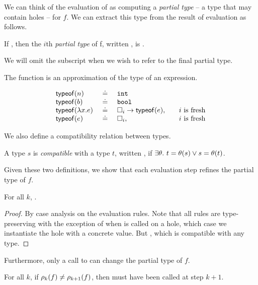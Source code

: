 We can think of the evaluation of  as computing a
\emph{partial type} -- a type that may contain holes -- for $f$.
%
We can extract this type from the result of evaluation as follows.
%
\begin{defn}
\label{defn:partial-type}
  If , then the $i$th
  \emph{partial type} of f, written ,
  is .

  We will omit the subscript when we wish to refer to the final partial
  type.
\end{defn}
%
The \typeof{} function is an approximation of the type of an expression.
\begin{defn}
\label{def:typeof}
  \[
  \begin{array}{lcll}
    \mathsf{typeof}(n)   & \ \doteq\  & \mathtt{int} & \\
    \mathsf{typeof}(b)   & \ \doteq\  & \mathtt{bool} & \\
    \mathsf{typeof}(\lambda x. e) & \ \doteq\  & {\square_{i}} \rightarrow \mathsf{typeof}(e), & \quad \text{$i$ is fresh} \\
    \mathsf{typeof}(e) & \ \doteq\  & \square_{i}, & \quad \text{$i$ is fresh} \\
  \end{array}
  \]
\end{defn}
%
We also define a compatibility relation between types.
%
\begin{defn}
\label{defn:type-compat}
  A type $s$ is \emph{compatible} with a type $t$, written , if
  $\exists \theta.\ t = \theta(s) \lor s = \theta(t)$.
\end{defn}
%
Given these two definitions, we show that each evaluation step
refines the partial type of $f$.
%
\begin{lem}
\label{lem:refine-partial}
  For all $k$, .
\end{lem}
\begin{proof}
  By case analysis on the evaluation rules. 
  Note that all rules are type-preserving with the exception of when
  \forcesym is called on a hole, which case we instantiate the hole with
  a concrete value.
  But \hastype{\ehole{}}{\thole{}}, which is compatible with any type.
\end{proof}
%
Furthermore, only a call to \forcesym can change the partial type of $f$.
%
\begin{lem}
\label{lem:force-inst}
  For all $k$, if $\rho_{k}(f) \neq \rho_{k+1}(f)$, then \forcesym must
  have been called at step $k+1$.
\end{lem}
